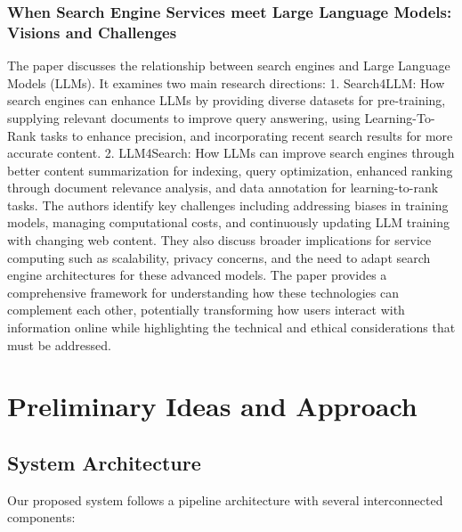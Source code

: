 \documentclass[fleqn,moreauthors,10pt]{ds_report}
\begin{document}
\subsubsection{When Search Engine Services meet Large Language Models: Visions and Challenges}

The paper discusses the relationship between search engines and Large Language Models (LLMs). It examines two main research directions:
	1.	Search4LLM: How search engines can enhance LLMs by providing diverse datasets for pre-training, supplying relevant documents to improve query answering, using Learning-To-Rank tasks to enhance precision, and incorporating recent search results for more accurate content.
	2.	LLM4Search: How LLMs can improve search engines through better content summarization for indexing, query optimization, enhanced ranking through document relevance analysis, and data annotation for learning-to-rank tasks.
The authors identify key challenges including addressing biases in training models, managing computational costs, and continuously updating LLM training with changing web content. They also discuss broader implications for service computing such as scalability, privacy concerns, and the need to adapt search engine architectures for these advanced models.
The paper provides a comprehensive framework for understanding how these technologies can complement each other, potentially transforming how users interact with information online while highlighting the technical and ethical considerations that must be addressed. \cite{xiong2024}

\section*{Preliminary Ideas and Approach}

\subsection*{System Architecture}
Our proposed system follows a pipeline architecture with several interconnected components:
\end{document}
